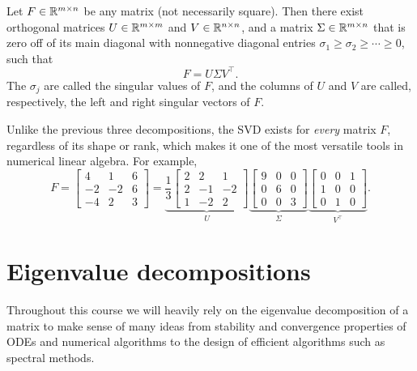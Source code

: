 \begin{definition}
    Let $F \in \mathbb{R}^{m \times n}$ be any matrix (not necessarily square). Then there exist orthogonal matrices $U \in \mathbb{R}^{m \times m}$ and $V \in \mathbb{R}^{n \times n}$, and a matrix $\Sigma \in \mathbb{R}^{m \times n}$ that is zero off of its main diagonal with nonnegative diagonal entries $\sigma_1 \ge \sigma_2 \ge \cdots \ge 0$, such that
    \begin{equation*}
        F = U \Sigma V^\top.
    \end{equation*}
    The $\sigma_j$ are called the singular values of $F$, and the columns of $U$ and $V$ are called, respectively, the left and right singular vectors of $F$.
\end{definition}
Unlike the previous three decompositions, the SVD exists for \emph{every} matrix $F$, regardless of its shape or rank, which makes it one of the most versatile tools in numerical linear algebra. For example,
\begin{equation*}
    F = \begin{bmatrix}
        4 & 1 & 6 \\
        -2 & -2 & 6 \\
        -4 & 2 & 3
    \end{bmatrix}
    =
    \underbrace{\frac{1}{3}\begin{bmatrix}
        2 & 2 & 1 \\
        2 & -1 & -2 \\
        1 & -2 & 2
    \end{bmatrix}}_{U}
    \underbrace{\begin{bmatrix}
        9 & 0 & 0 \\
        0 & 6 & 0 \\
        0 & 0 & 3
    \end{bmatrix}}_{\Sigma}
    \underbrace{\begin{bmatrix}
        0 & 0 & 1 \\
        1 & 0 & 0 \\
        0 & 1 & 0
    \end{bmatrix}}_{V^\top}.
\end{equation*}


\section{Eigenvalue decompositions}

Throughout this course we will heavily rely on the eigenvalue decomposition of 
a matrix to make sense of many ideas from stability and convergence 
properties of ODEs and numerical algorithms to the design of 
efficient algorithms such as spectral methods. 

